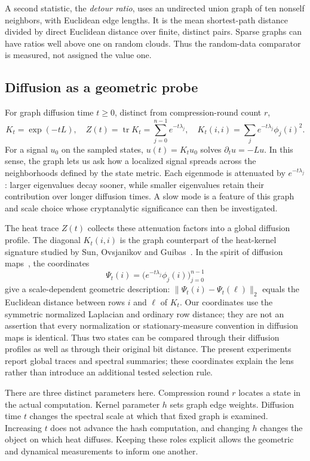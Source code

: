 \documentclass[11pt]{article}
\begin{document}
A second statistic, the \emph{detour ratio}, uses an undirected union graph of ten nonself neighbors, with Euclidean edge lengths. It is the mean shortest-path distance divided by direct Euclidean distance over finite, distinct pairs. Sparse graphs can have ratios well above one on random clouds. Thus the random-data comparator is measured, not assigned the value one.

\subsection{Diffusion as a geometric probe}
For graph diffusion time $t\geq0$, distinct from compression-round count $r$,
\begin{equation}
 K_t=\exp(-tL),\quad Z(t)=\operatorname{tr}K_t=\sum_{j=0}^{n-1}e^{-t\lambda_j},\quad
 K_t(i,i)=\sum_j e^{-t\lambda_j}\phi_j(i)^2.
\end{equation}
For a signal $u_0$ on the sampled states, $u(t)=K_tu_0$ solves $\partial_tu=-Lu$. In this sense, the graph lets us ask how a localized signal spreads across the neighborhoods defined by the state metric. Each eigenmode is attenuated by $e^{-t\lambda_j}$: larger eigenvalues decay sooner, while smaller eigenvalues retain their contribution over longer diffusion times. A slow mode is a feature of this graph and scale choice whose cryptanalytic significance can then be investigated.

The heat trace $Z(t)$ collects these attenuation factors into a global diffusion profile. The diagonal $K_t(i,i)$ is the graph counterpart of the heat-kernel signature studied by Sun, Ovsjanikov and Guibas~\cite{sun}. In the spirit of diffusion maps~\cite{coifman}, the coordinates
\begin{equation}
 \Psi_t(i)=\bigl(e^{-t\lambda_j}\phi_j(i)\bigr)_{j=0}^{n-1}
\end{equation}
give a scale-dependent geometric description: $\|\Psi_t(i)-\Psi_t(\ell)\|_2$ equals the Euclidean distance between rows $i$ and $\ell$ of $K_t$. Our coordinates use the symmetric normalized Laplacian and ordinary row distance; they are not an assertion that every normalization or stationary-measure convention in diffusion maps is identical. Thus two states can be compared through their diffusion profiles as well as through their original bit distance. The present experiments report global traces and spectral summaries; these coordinates explain the lens rather than introduce an additional tested selection rule.

There are three distinct parameters here. Compression round $r$ locates a state in the actual computation. Kernel parameter $h$ sets graph edge weights. Diffusion time $t$ changes the spectral scale at which that fixed graph is examined. Increasing $t$ does not advance the hash computation, and changing $h$ changes the object on which heat diffuses. Keeping these roles explicit allows the geometric and dynamical measurements to inform one another.
\end{document}
